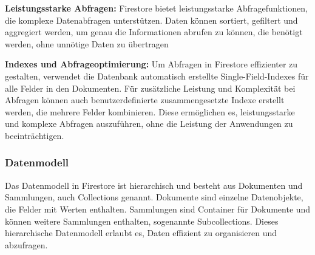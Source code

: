 \textbf{Leistungsstarke Abfragen:} Firestore bietet leistungsstarke Abfragefunktionen, die komplexe Datenabfragen unterstützen.
Daten können sortiert, gefiltert und aggregiert werden, um
genau die Informationen abrufen zu können, die benötigt
werden, ohne unnötige Daten zu übertragen

\textbf{Indexes und Abfrageoptimierung:} Um Abfragen in Firestore effizienter zu gestalten, verwendet die Datenbank automatisch erstellte Single-Field-Indexes für alle Felder in den Dokumenten. Für zusätzliche Leistung und Komplexität bei Abfragen können auch benutzerdefinierte zusammengesetzte Indexe erstellt werden, die mehrere Felder kombinieren. Diese ermöglichen es, leistungsstarke und komplexe Abfragen auszuführen, ohne die Leistung der Anwendungen zu beeinträchtigen.


\subsubsection{Datenmodell}

Das Datenmodell\cite{firestore_datamodel} in Firestore ist hierarchisch und besteht aus Dokumenten und Sammlungen, auch Collections genannt. Dokumente sind einzelne Datenobjekte, die Felder mit Werten enthalten. Sammlungen sind Container für Dokumente und können weitere Sammlungen enthalten, sogenannte Subcollections. Dieses hierarchische Datenmodell erlaubt es, Daten effizient zu organisieren und abzufragen.




